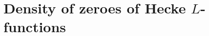 \documentclass[./main]{subfiles}
\begin{document}
\section{Density of zeroes of Hecke \texorpdfstring{$L$}{L}-functions}
\end{document}
